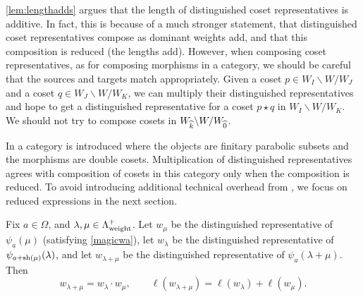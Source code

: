 \cref{lem:lengthadds} argues that the length of distinguished coset representatives is additive. In fact, this is because of a much stronger statement, that distinguished coset representatives compose as dominant weights add, and that this composition is reduced (the lengths add). However, when composing coset representatives, as for composing morphisms in a category, we should be careful that the sources and targets match appropriately. Given a coset $p \in W_I \backslash W / W_J$ and a coset $q \in W_J \backslash W / W_K$, we can multiply their distinguished representatives and hope to get a distinguished representative for a coset $p \star q$ in $W_I \backslash W / W_K$. We should not try to compose cosets in $W_{\widehat{k}} \backslash W / W_{\widehat{0}}$.

\begin{remark} In \cite{EKo} a category is introduced where the objects are finitary parabolic subsets and the morphisms are double cosets. Multiplication of distinguished representatives agrees with composition of cosets in this category only when the composition is reduced. To avoid introducing additional technical overhead from \cite{EKo}, we focus on reduced expressions in the next section. \end{remark}

\begin{theorem} \label{thm:weightsadd} Fix $a \in \Omega$, and $\lambda, \mu \in \Lambda^+_{\operatorname{weight}}$. Let $w_{\mu}$ be the distinguished representative of $\psi_a(\mu)$ (satisfying \eqref{magicwa}), let $w_{\lambda}$ be the distinguished representative of $\psi_{a+\operatorname{sh}(\mu)}(\lambda)$, and let $w_{\lambda + \mu}$ be the distinguished representative of $\psi_a(\lambda + \mu)$. Then
\begin{equation} w_{\lambda + \mu} = w_{\lambda} \cdot w_{\mu}, \qquad \ell(w_{\lambda + \mu}) = \ell(w_{\lambda}) + \ell(w_{\mu}). \end{equation}
\end{theorem}

